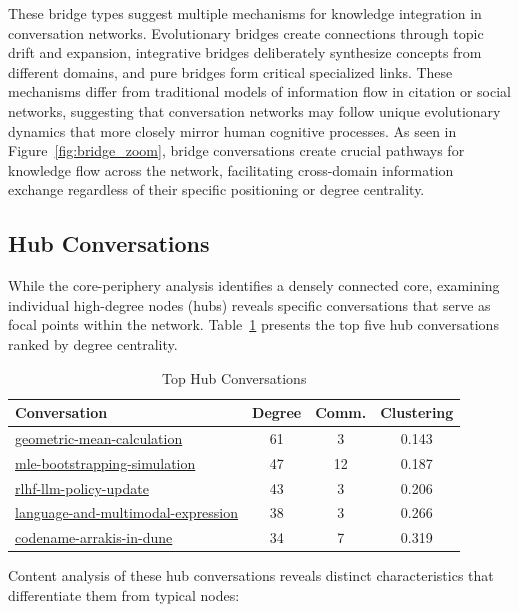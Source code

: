 \documentclass[10pt, a4paper]{article}
\begin{document}
These bridge types suggest multiple mechanisms for knowledge integration in conversation networks. Evolutionary bridges create connections through topic drift and expansion, integrative bridges deliberately synthesize concepts from different domains, and pure bridges form critical specialized links. These mechanisms differ from traditional models of information flow in citation or social networks, suggesting that conversation networks may follow unique evolutionary dynamics that more closely mirror human cognitive processes. As seen in Figure~\ref{fig:bridge_zoom}, bridge conversations create crucial pathways for knowledge flow across the network, facilitating cross-domain information exchange regardless of their specific positioning or degree centrality.


\subsection{Hub Conversations}

While the core-periphery analysis identifies a densely connected core, examining individual high-degree nodes (hubs) reveals specific conversations that serve as focal points within the network. Table~\ref{tab:hubs} presents the top five hub conversations ranked by degree centrality.

\begin{table}
\centering
\caption{Top Hub Conversations}
\label{tab:hubs}
\begin{tabular}{lccc}
\toprule
\textbf{Conversation} & \textbf{Degree} & \textbf{Comm.} & \textbf{Clustering} \\
\midrule
\url{geometric-mean-calculation} & 61 & 3 & 0.143 \\
\url{mle-bootstrapping-simulation} & 47 & 12 & 0.187 \\
\url{rlhf-llm-policy-update} & 43 & 3 & 0.206 \\
\url{language-and-multimodal-expression} & 38 & 3 & 0.266 \\
\url{codename-arrakis-in-dune} & 34 & 7 & 0.319 \\
\bottomrule
\end{tabular}
\end{table}

Content analysis of these hub conversations reveals distinct characteristics that differentiate them from typical nodes:
\end{document}
